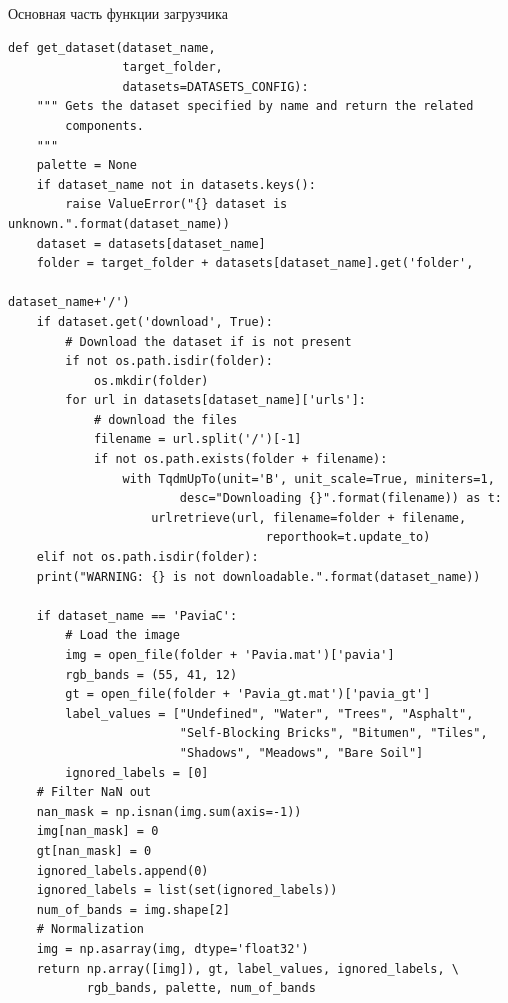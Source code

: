 \documentclass[14pt, russian]{scrartcl}
\begin{document}
\begin{listing}[!h]
    \caption{Основная часть функции загрузчика}
    \label{lst:dataset_loader}
    \begin{verbatim}
def get_dataset(dataset_name,
                target_folder,
                datasets=DATASETS_CONFIG):
    """ Gets the dataset specified by name and return the related
        components.
    """
    palette = None    
    if dataset_name not in datasets.keys():
        raise ValueError("{} dataset is unknown.".format(dataset_name))
    dataset = datasets[dataset_name]
    folder = target_folder + datasets[dataset_name].get('folder',
                                                        dataset_name+'/')
    if dataset.get('download', True):
        # Download the dataset if is not present
        if not os.path.isdir(folder):
            os.mkdir(folder)
        for url in datasets[dataset_name]['urls']:
            # download the files
            filename = url.split('/')[-1]
            if not os.path.exists(folder + filename):
                with TqdmUpTo(unit='B', unit_scale=True, miniters=1,
                        desc="Downloading {}".format(filename)) as t:
                    urlretrieve(url, filename=folder + filename,
                                    reporthook=t.update_to)
    elif not os.path.isdir(folder):
    print("WARNING: {} is not downloadable.".format(dataset_name))

    if dataset_name == 'PaviaC':
        # Load the image
        img = open_file(folder + 'Pavia.mat')['pavia']
        rgb_bands = (55, 41, 12)
        gt = open_file(folder + 'Pavia_gt.mat')['pavia_gt']
        label_values = ["Undefined", "Water", "Trees", "Asphalt",
                        "Self-Blocking Bricks", "Bitumen", "Tiles", 
                        "Shadows", "Meadows", "Bare Soil"]
        ignored_labels = [0]
    # Filter NaN out
    nan_mask = np.isnan(img.sum(axis=-1))
    img[nan_mask] = 0
    gt[nan_mask] = 0
    ignored_labels.append(0)
    ignored_labels = list(set(ignored_labels))
    num_of_bands = img.shape[2]
    # Normalization
    img = np.asarray(img, dtype='float32')
    return np.array([img]), gt, label_values, ignored_labels, \
           rgb_bands, palette, num_of_bands
    \end{verbatim}
\end{listing}
\end{document}
